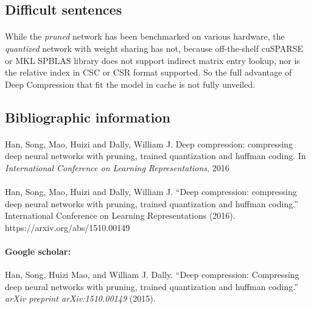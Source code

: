 \documentclass{article}
\begin{document}
\subsection{Difficult sentences}

\paragraph{} While the \emph{pruned} network has been benchmarked on various hardware, 
the \emph{quantized} network with weight sharing has not, because off-the-shelf 
cuSPARSE or MKL SPBLAS library does not support indirect matrix entry lookup, nor is 
the relative index in CSC or CSR format supported. So the full
advantage of Deep Compression that fit the model in cache is not fully unveiled. 

\subsection{Bibliographic information}

\paragraph{} Han, Song, Mao, Huizi and Dally, William J. Deep compression: compressing 
deep neural networks with pruning, trained quantization and huffman coding. In \emph{
International Conference on Learning Representations}, 2016

\paragraph{} Han, Song, Mao, Huizi and Dally, William J. ``Deep compression: compressing 
deep neural networks with pruning, trained quantization and huffman coding.'' 
International Conference on Learning Representations (2016). https://arxiv.org/abs/1510.00149

\paragraph{Google scholar:} Han, Song, Huizi Mao, and William J. Dally. ``Deep compression: Compressing deep 
neural networks with pruning, trained quantization and huffman coding.'' \emph{arXiv 
preprint arXiv:1510.00149} (2015).
\end{document}
